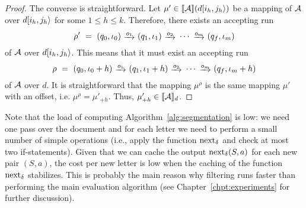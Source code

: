 \begin{proof}
    The converse is straightforward. Let $\mu' \in \llbracket\mathcal{A}\rrbracket(d[i_h, j_h\rangle)$
    be a mapping of $\mathcal{A}$ over $d[i_h, j_h\rangle$ for some $1 \leq h \leq k$.
    Therefore, there exists an accepting run
    $$
    \rho' \ = \ (q_0, \iota_0) \ \trans{o_1} \ (q_1, \iota_1) \ \trans{o_2} \ \cdots \ \trans{o_m} \ (q_f, \iota_m)
    $$
    of $\mathcal{A}$ over $d[i_h, j_h\rangle$. This means that it must exist an
    accepting run
    $$
    \rho \ = \ (q_0, \iota_0+h) \ \trans{o_1} \ (q_1, \iota_1+h) \ \trans{o_2} \ \cdots \ \trans{o_m} \ (q_f, \iota_m+h)
    $$
    of $\mathcal{A}$ over $d$. It is straightforward that the mapping $\mu^\rho$ is the
    same mapping $\mu'$ with an offset, i.e. $\mu^\rho = \mu'_{+h}$. Thus,
    $\mu'_{+h} \in \llbracket\mathcal{A}\rrbracket_d$.
\end{proof}

Note that the load of computing Algorithm~\ref{alg:segmentation} is low: we need
one pass over the document and for each letter we need to perform a small number
of simple operations (i.e., apply the function $\operatorname{next}_{\delta}$ and check at most two
if-statements). Given that we can cache the output $\operatorname{next}_{\delta}(S, a)$ for each new
pair $(S, a)$, the cost per new letter is low when the caching of the function
$\operatorname{next}_{\delta}$ stabilizes. This is probably the main reason why filtering runs faster
than performing the main evaluation algorithm (see
Chapter~\ref{chpt:experiments} for further discussion).



